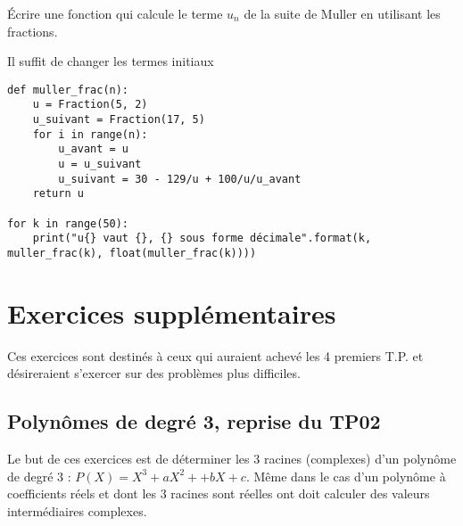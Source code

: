 \begin{Exercise}[title={Usage des fractions}]
Écrire une fonction  qui calcule le terme $u_n$ de la suite de Muller en utilisant les fractions.
\end{Exercise}
\begin{Answer} Il suffit de changer les termes initiaux
\begin{lstlisting}
def muller_frac(n):
    u = Fraction(5, 2)
    u_suivant = Fraction(17, 5)
    for i in range(n):
        u_avant = u
        u = u_suivant
        u_suivant = 30 - 129/u + 100/u/u_avant
    return u

for k in range(50):
    print("u{} vaut {}, {} sous forme décimale".format(k, muller_frac(k), float(muller_frac(k))))
\end{lstlisting}
\end{Answer} 
\section{Exercices supplémentaires}
Ces exercices sont destinés à ceux qui auraient achevé les 4 premiers T.P. et désireraient s'exercer sur des problèmes plus difficiles.
\subsection{Polynômes de degré 3, reprise du TP02}
Le but de ces exercices est de déterminer les 3 racines (complexes) d'un polynôme de degré 3 : $P(X)=X^3+aX^2++bX+c$. Même dans le cas d'un polynôme à coefficients réels et dont les 3 racines sont réelles ont doit calculer des valeurs intermédiaires complexes. 

